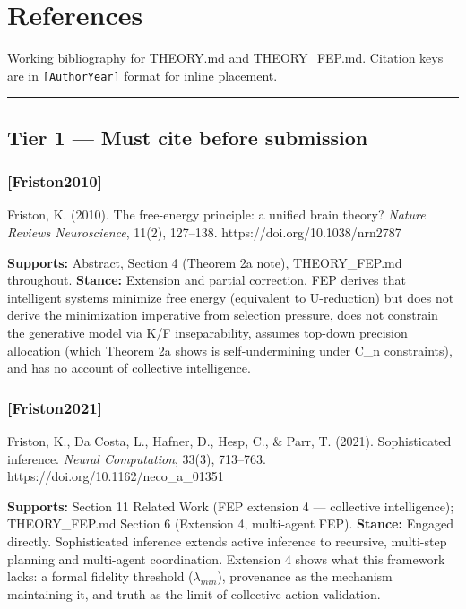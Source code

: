 \documentclass[
]{article}
\author{}
\date{}
\begin{document}
\section{References}\label{references}

Working bibliography for THEORY.md and THEORY\_FEP.md. Citation keys are
in \texttt{{[}AuthorYear{]}} format for inline placement.

\begin{center}\rule{0.5\linewidth}{0.5pt}\end{center}

\subsection{Tier 1 --- Must cite before
submission}\label{tier-1-must-cite-before-submission}

\subsubsection{{[}Friston2010{]}}\label{friston2010}

Friston, K. (2010). The free-energy principle: a unified brain theory?
\emph{Nature Reviews Neuroscience}, 11(2), 127--138.
https://doi.org/10.1038/nrn2787

\textbf{Supports:} Abstract, Section 4 (Theorem 2a note), THEORY\_FEP.md
throughout. \textbf{Stance:} Extension and partial correction. FEP
derives that intelligent systems minimize free energy (equivalent to
U-reduction) but does not derive the minimization imperative from
selection pressure, does not constrain the generative model via K/F
inseparability, assumes top-down precision allocation (which Theorem 2a
shows is self-undermining under C\_n constraints), and has no account of
collective intelligence.

\subsubsection{{[}Friston2021{]}}\label{friston2021}

Friston, K., Da Costa, L., Hafner, D., Hesp, C., \& Parr, T. (2021).
Sophisticated inference. \emph{Neural Computation}, 33(3), 713--763.
https://doi.org/10.1162/neco\_a\_01351

\textbf{Supports:} Section 11 Related Work (FEP extension 4 ---
collective intelligence); THEORY\_FEP.md Section 6 (Extension 4,
multi-agent FEP). \textbf{Stance:} Engaged directly. Sophisticated
inference extends active inference to recursive, multi-step planning and
multi-agent coordination. Extension 4 shows what this framework lacks: a
formal fidelity threshold (\(\lambda_{min}\)), provenance as the
mechanism maintaining it, and truth as the limit of collective
action-validation.
\end{document}
